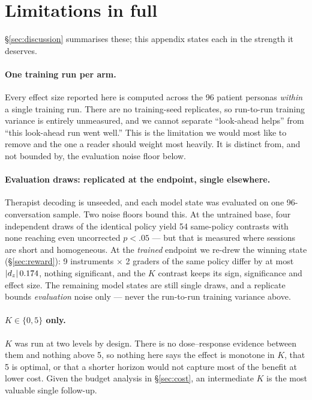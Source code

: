 \section{Limitations in full}
\label{app:limitations}

\S\ref{sec:discussion} summarises these; this appendix states each in the strength it deserves.

\paragraph{One training run per arm.}
Every effect size reported here is computed across the 96 patient personas \emph{within} a single
training run. There are no training-seed replicates, so run-to-run training variance is entirely
unmeasured, and we cannot separate ``look-ahead helps'' from ``this look-ahead run went well.''
This is the limitation we would most like to remove and the one a reader should weight most
heavily. It is distinct from, and not bounded by, the evaluation noise floor below.

\paragraph{Evaluation draws: replicated at the endpoint, single elsewhere.}
Therapist decoding is unseeded, and each model state was evaluated on one 96-conversation sample.
Two noise floors bound this. At the untrained base, four independent draws of the identical policy
yield 54 same-policy contrasts with none reaching even uncorrected $p < .05$ --- but that is
measured where sessions are short and homogeneous. At the \emph{trained} endpoint we re-drew the
winning state (\S\ref{sec:reward}): 9 instruments $\times$ 2 graders of the same policy differ
by at most $|d_z|\,0.174$, nothing significant, and the $K$ contrast keeps its sign, significance
and effect size. The remaining model states are still single draws, and a replicate bounds
\emph{evaluation} noise only --- never the run-to-run training variance above.

\paragraph{$K \in \{0, 5\}$ only.}
$K$ was run at two levels by design. There is no dose--response evidence between them and nothing
above 5, so nothing here says the effect is monotone in $K$, that 5 is optimal, or that a shorter
horizon would not capture most of the benefit at lower cost. Given the budget analysis in
\S\ref{sec:cost}, an intermediate $K$ is the most valuable single follow-up.

